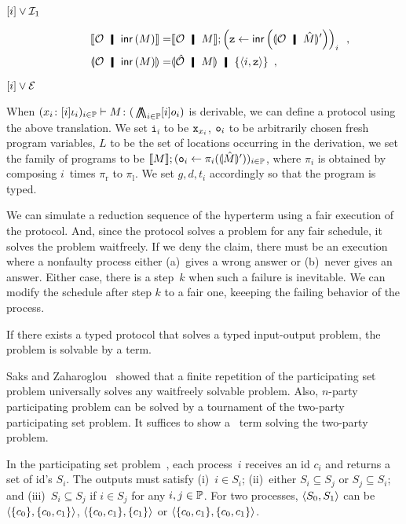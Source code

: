 {\begin{description}
 \item[$\lbrack {i}\rbrack\vee\mathcal I_1$] 
\begin{align*}
 \semo{\hypert\hmid \linr M} =& \semo{\hypert\hmid M}; \left(\p z \leftarrow
 \linr{\semoi{\hypert\hmid\hat M}'}\right)_i\enspace, \\
 \semoi{\hypert\hmid \linr{M}}=& \semoi{\hat \hypert\hmid M}\hmid
 \{\tuple{i, \p z}\}\enspace,
\end{align*}
 \item[$\lbrack {i}\rbrack\vee\mathcal E$] 
\end{description}
When $({x_i} \colon{[i]\iota_i})_{i\in\mathbb{P}}
\vdash{M} \colon{(}\operatorname*{\bigwedge\kern -8pt \bigwedge}_{i\in \mathbb{P}}[i]o_i)$ is
derivable,
we can define a protocol using the above translation.
We set $\mathtt i_i$ to be ${\texttt{x}}_{x_i}$, ${\texttt{o}}_i$ to be arbitrarily
chosen fresh program variables, $L$ to be the set of locations
occurring in the derivation, we set the family of programs to be
$\llbracket{M}\rrbracket; ({\texttt{o}}_i\leftarrow \pi_i(\llparenthesis{\hat M}\rrparenthesis'))_{i\in\mathbb{P}}$,
where $\pi_i$ is obtained by composing $i$~times $\pi_{\mathrm r}$ to
$\pi_{\mathrm l}$.
We set $g,d,t_i$ accordingly so that the program is typed.

We can simulate a reduction sequence of
the hyperterm using a fair execution of the protocol.
And, since the protocol solves a problem for any fair schedule, it
solves the problem waitfreely.
If we deny the claim, there must be an execution where a nonfaulty
process
either (a)~gives a
wrong answer or
 (b)~never gives an answer.
 Either case, there is a step~$k$ when
 such a failure is inevitable.
We can modify the schedule after step $k$ to a fair one,
keeeping the failing behavior of
the process.


\begin{theorem}[Completeness]
If there exists a typed protocol that solves a typed input-output
 problem,
the problem is solvable by a term.
\end{theorem}

Saks and Zaharoglou~\cite{Saks:1993vq} showed that a finite repetition of the participating set
problem universally solves any waitfreely solvable problem.
Also, $n$-party participating problem can be solved by a tournament of
the two-party participating set problem.
It suffices to show a \lgd\, term solving the two-party problem.


In the participating set problem~\cite{borowsky},
each process~$i$ receives an id $c_i$ and
returns a set of id's $S_i$.
The outputs must satisfy (i)~$i\in S_i$; (ii)~either $S_i\subseteq S_j$
or $S_j\subseteq S_i$; and (iii)~$S_i\subseteq S_j$  if $i\in S_j$ for any
$i,j\in\mathbb{P}$.
For two processes,
$\langle{S_0, S_1}\rangle$ can be $\langle{\{c_0\}, \{c_0, c_1\}}\rangle$, $\langle{\{c_0, c_1\}, \{c_1\}}\rangle$
or
$\langle{\{c_0, c_1\}, \{c_0, c_1\}}\rangle$.

}
